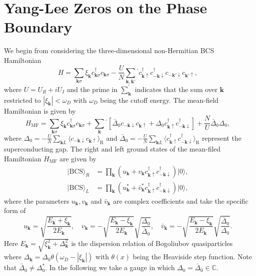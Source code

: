 \documentclass[aps,onecolumn,superscriptaddress,notitlepage,longbibliography]{revtex4-1}
\begin{document}
\section{Yang-Lee Zeros on the Phase Boundary}
We begin from considering the three-dimensional non-Hermitian BCS Hamiltonian
\begin{equation}
	H=\sum_{\boldsymbol{k}\sigma}\xi_{\boldsymbol{k}}c_{\boldsymbol{k}\sigma}^{\dagger}c_{\boldsymbol{k}\sigma}-\frac{U}{N}\sum_{\bm{k},\bm{k}'}{}^{'}c_{\bm{k}\uparrow}^{\dagger}c_{\bm{-k}\downarrow}^{\dagger}c_{\bm{-k}'\downarrow}c_{\bm{k}'\uparrow}, \label{eq:non-Hermitian}
	\end{equation}
where $U=U_R+iU_I$ and the prime in $\sum_{\bm{k}}^{'}$ indicates that the sum over $\bm{k}$ restricted to  $|\xi_{\boldsymbol{k}}|<\omega_D$ with $\omega_D$ being the cutoff energy. The mean-field Hamiltonian is given by 
\begin{equation}
H_{\mathrm{MF}}=\sum_{\boldsymbol{k}\sigma}\xi_{\boldsymbol{k}}c_{\boldsymbol{k}\sigma}^{\dagger}c_{\boldsymbol{k}\sigma}+\sum_{\bm{k}}{}^{'}[\bar{\Delta}_0c_{-\bm{k}\downarrow}c_{\bm{k}\uparrow}+\Delta_0 c_{\bm{k}\uparrow}^{\dagger}c_{-\bm{k}\downarrow}^{\dagger}]+\frac{N}{U}\bar{\Delta}_{0}\Delta_{0},
\end{equation}
 where $\Delta_{0}=-\frac{U}{N}\sum_{\boldsymbol{k}L}\langle c_{-\boldsymbol{k}\downarrow}c_{\boldsymbol{k}\uparrow}\rangle_{\mathrm{R}}$ and $\bar{\Delta}_0=-\frac{U}{N}\sum_{\boldsymbol{k}L}\langle c^{\dagger}_{\boldsymbol{k}\uparrow}c^{\dagger}_{-\boldsymbol{k}\downarrow}\rangle_{\mathrm{R}}$ represent the superconducting gap. The right and left ground states of the mean-filed Hamiltonian $H_{\mathrm{MF}}$ are given by \cite{Yamamoto2019}
\begin{align}
	|\text{BCS}\rangle_{R}&=\prod_{\bm{k}}(u_{\bm{k}}+v_{\bm{k}}c_{\boldsymbol{k}\uparrow}^{\dagger}c_{-\boldsymbol{k}\downarrow}^{\dagger})|0\rangle,\\
	|\text{BCS}\rangle_{L}&=\prod_{\bm{k}}(u^{*}_{\bm{k}}+\bar{v}^{*}_{\bm{k}}c_{\boldsymbol{k}\uparrow}^{\dagger}c_{-\boldsymbol{k}\downarrow}^{\dagger})|0\rangle,
\end{align}
where the parameters $u_{\bm{k}},v_{\bm{k}}$ and $\bar{v}_{\bm{k}}$ are complex coefficients and take the specific form of
\begin{equation}
	u_{\bm{k}}=\sqrt{\frac{E_{\bm{k}}+\xi_{\bm{k}}}{2E_{\bm{k}}}},\quad v_{\bm{k}}=-\sqrt{\frac{E_{\bm{k}}-\xi_{\bm{k}}}{2E_{\bm{k}}}}\sqrt{\frac{\Delta_0}{\bar{\Delta}_0}},\quad
	\bar{v}_{\bm{k}}=-\sqrt{\frac{E_{\bm{k}}-\xi_{\bm{k}}}{2E_{\bm{k}}}}\sqrt{\frac{\bar{\Delta}_0}{\Delta_0}}.
\end{equation}
Here $E_{\bm{k}}=\sqrt{\xi_{\bm{k}}^2+\Delta_{\bm{k}}^2}$ is the dispersion relation of Bogoliubov quasiparticles where $\Delta_{\bm{k}}=\Delta_0\theta(\omega_D-|\xi_{\bm{k}}|)$ with $\theta(x)$ being the Heaviside step function. Note that $\bar{\Delta}_0\neq\Delta_0^*$. In the following we take a gauge  \cite{Yamamoto2019} in which $\Delta_0=\bar{\Delta}_0\in\mathbb{C}$.
\end{document}
